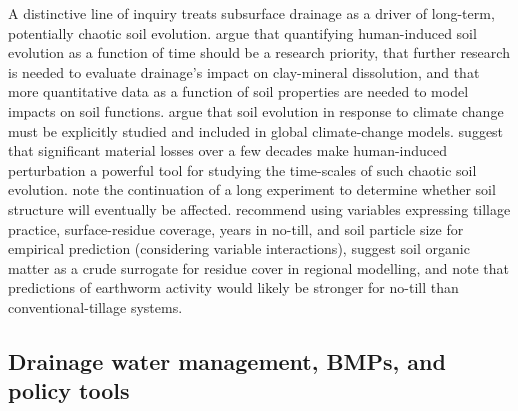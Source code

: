 \documentclass[11pt]{article}
\begin{document}
A distinctive line of inquiry treats subsurface drainage as a driver of long-term, potentially chaotic soil evolution. \textcite{Montagne2009} argue that quantifying human-induced soil evolution as a function of time should be a research priority, that further research is needed to evaluate drainage's impact on clay-mineral dissolution, and that more quantitative data as a function of soil properties are needed to model impacts on soil functions. \textcite{Montagne2010} argue that soil evolution in response to climate change must be explicitly studied and included in global climate-change models. \textcite{Montagne2013} suggest that significant material losses over a few decades make human-induced perturbation a powerful tool for studying the time-scales of such chaotic soil evolution. \textcite{HOOGHOUDT1952} note the continuation of a long experiment to determine whether soil structure will eventually be affected. \textcite{Ouellet2008} recommend using variables expressing tillage practice, surface-residue coverage, years in no-till, and soil particle size for empirical prediction (considering variable interactions), suggest soil organic matter as a crude surrogate for residue cover in regional modelling, and note that predictions of earthworm activity would likely be stronger for no-till than conventional-tillage systems.

\subsection{Drainage water management, BMPs, and policy tools}
\end{document}
